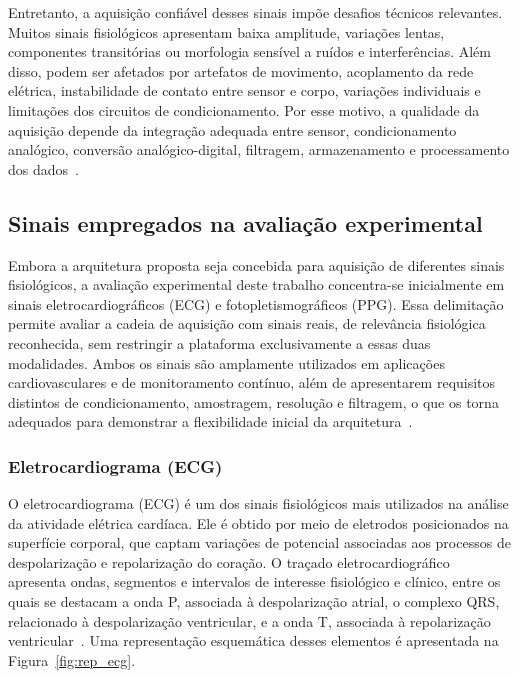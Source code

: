 \documentclass[a4paper,12pt]{fcte}
\begin{document}
Entretanto, a aquisição confiável desses sinais impõe desafios técnicos relevantes. Muitos sinais fisiológicos apresentam baixa amplitude, variações lentas, componentes transitórias ou morfologia sensível a ruídos e interferências. Além disso, podem ser afetados por artefatos de movimento, acoplamento da rede elétrica, instabilidade de contato entre sensor e corpo, variações individuais e limitações dos circuitos de condicionamento. Por esse motivo, a qualidade da aquisição depende da integração adequada entre sensor, condicionamento analógico, conversão analógico-digital, filtragem, armazenamento e processamento dos dados~\cite{ates2022wearable_sensors,charlton2022wearable_ppg}.

\subsection{Sinais empregados na avaliação experimental}

Embora a arquitetura proposta seja concebida para aquisição de diferentes sinais fisiológicos, a avaliação experimental deste trabalho concentra-se inicialmente em sinais eletrocardiográficos (ECG) e fotopletismográficos (PPG). Essa delimitação permite avaliar a cadeia de aquisição com sinais reais, de relevância fisiológica reconhecida, sem restringir a plataforma exclusivamente a essas duas modalidades. Ambos os sinais são amplamente utilizados em aplicações cardiovasculares e de monitoramento contínuo, além de apresentarem requisitos distintos de condicionamento, amostragem, resolução e filtragem, o que os torna adequados para demonstrar a flexibilidade inicial da arquitetura~\cite{hughes2023wearable_cardiovascular,charlton2022wearable_ppg}.

\subsubsection{Eletrocardiograma (ECG)}

O eletrocardiograma (ECG) é um dos sinais fisiológicos mais utilizados na análise da atividade elétrica cardíaca. Ele é obtido por meio de eletrodos posicionados na superfície corporal, que captam variações de potencial associadas aos processos de despolarização e repolarização do coração. O traçado eletrocardiográfico apresenta ondas, segmentos e intervalos de interesse fisiológico e clínico, entre os quais se destacam a onda P, associada à despolarização atrial, o complexo QRS, relacionado à despolarização ventricular, e a onda T, associada à repolarização ventricular~\cite{ardeti2023ecg,das2014ecg}. Uma representação esquemática desses elementos é apresentada na Figura~\ref{fig:rep_ecg}.
\end{document}
